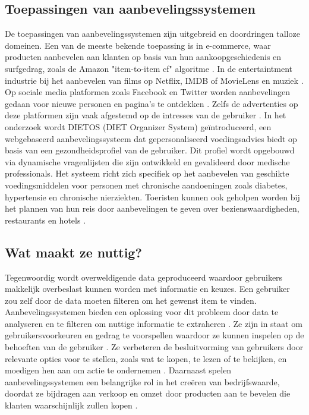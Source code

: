 \subsection{Toepassingen van aanbevelingssystemen}
De toepassingen van aanbevelingssystemen zijn uitgebreid en doordringen talloze domeinen. Een van de meeste bekende toepassing is in e-commerce, waar producten aanbevelen aan klanten op basis van hun aankoopgeschiedenis en surfgedrag, zoals de Amazon "item-to-item \ac{cf}" algoritme \autocite{Patel2023, Patel2020}.
In de entertaintment industrie bij het aanbevelen van films op Netflix, IMDB of MovieLens en muziek \autocite{Patel2020, Roy2022}. Op sociale media platformen zoals Facebook en Twitter worden aanbevelingen gedaan voor nieuwe personen en pagina's te ontdekken \autocite{Patel2023}. Zelfs de advertenties op deze platformen zijn vaak afgestemd op de intresses van de gebruiker \autocite{Patel2020}.
In het onderzoek \textcite{Agapito2016} wordt DIETOS (DIET Organizer System) geïntroduceerd, een webgebaseerd aanbevelingssysteem dat gepersonaliseerd voedingsadvies biedt op basis van een gezondheidsprofiel van de gebruiker. Dit profiel wordt opgebouwd via dynamische vragenlijsten die zijn ontwikkeld en gevalideerd door medische professionals. Het systeem richt zich specifiek op het aanbevelen van geschikte voedingsmiddelen voor personen met chronische aandoeningen zoals diabetes, hypertensie en chronische nierziekten. Toeristen kunnen ook geholpen worden bij het plannen van hun reis door aanbevelingen te geven over bezienswaardigheden, restaurants en hotels \autocite{Roy2022, Patel2023}.
\subsection{Wat maakt ze nuttig?}
Tegenwoordig wordt overweldigende data geproduceerd waardoor gebruikers makkelijk overbeslast kunnen worden met informatie en keuzes. Een gebruiker zou zelf door de data moeten filteren om het gewenst item te vinden. Aanbevelingssystemen bieden een oplossing voor dit probleem door data te analyseren en te filteren om nuttige informatie te extraheren \autocite{Fkih2022}. Ze zijn in staat om gebruikersvoorkeuren en gedrag te voorspellen waardoor ze kunnen inspelen op de behoeften van de gebruiker \autocite{Mazeh2020}. Ze verbeteren de besluitvorming van gebruikers door relevante opties voor te stellen, zoals wat te kopen, te lezen of te bekijken, en moedigen hen aan om actie te ondernemen \autocite{Mazeh2020}. Daarnaast spelen aanbevelingssystemen een belangrijke rol in het creëren van bedrijfswaarde, doordat ze bijdragen aan verkoop en omzet door producten aan te bevelen die klanten waarschijnlijk zullen kopen \autocite{Wang2018, Patel2023}.
